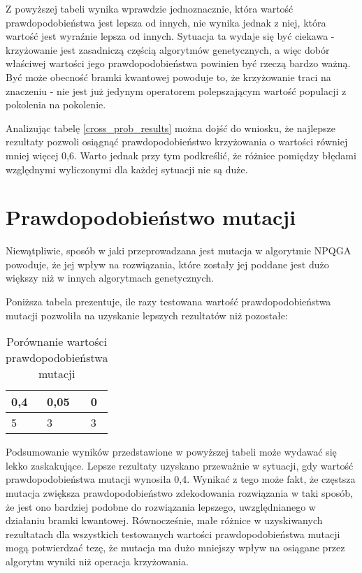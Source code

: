 Z powyższej tabeli wynika wprawdzie jednoznacznie, która wartość prawdopodobieństwa jest lepsza od innych, nie wynika jednak z niej, która wartość jest wyraźnie lepsza od innych. Sytuacja ta wydaje się być ciekawa - krzyżowanie jest zasadniczą częścią algorytmów genetycznych, a więc dobór właściwej wartości jego prawdopodobieństwa powinien być rzeczą bardzo ważną. Być może obecność bramki kwantowej powoduje to, że krzyżowanie traci na znaczeniu - nie jest już jedynym operatorem polepszającym wartość populacji z pokolenia na pokolenie.

Analizując tabelę \ref{cross_prob_results} można dojść do wniosku, że najlepsze rezultaty pozwoli osiągnąć prawdopodobieństwo krzyżowania o wartości równiej mniej więcej 0,6. Warto jednak przy tym podkreślić, że różnice pomiędzy błędami względnymi wyliczonymi dla każdej sytuacji nie są duże.

\section{Prawdopodobieństwo mutacji}
Niewątpliwie, sposób w jaki przeprowadzana jest mutacja w algorytmie NPQGA powoduje, że jej wpływ na rozwiązania, które zostały jej poddane jest dużo większy niż w innych algorytmach genetycznych.

Poniższa tabela prezentuje, ile razy testowana wartość prawdopodobieństwa mutacji pozwoliła na uzyskanie lepszych rezultatów niż pozostałe:

\begin{table}[H]
\label{bramka_results}
\begin{center}
\begin{tabular}{l l l}
\hline
0,4 & 0,05 & 0 \\
\hline
5 & 3 & 3 \\
\hline
\end{tabular}
\end{center}
\caption{Porównanie wartości prawdopodobieństwa mutacji}
\end{table}

Podsumowanie wyników przedstawione w powyższej tabeli może wydawać się lekko zaskakujące. Lepsze rezultaty uzyskano przeważnie w sytuacji, gdy wartość prawdopodobieństwa mutacji wynosiła 0,4. Wynikać z tego może fakt, że częstsza mutacja zwiększa prawdopodobieństwo zdekodowania rozwiązania w taki sposób, że jest ono bardziej podobne do rozwiązania lepszego, uwzględnianego w działaniu bramki kwantowej. Równocześnie, małe różnice w uzyskiwanych rezultatach dla wszystkich testowanych wartości prawdopodobieństwa mutacji mogą potwierdzać tezę, że mutacja ma dużo mniejszy wpływ na osiągane przez algorytm wyniki niż operacja krzyżowania.

